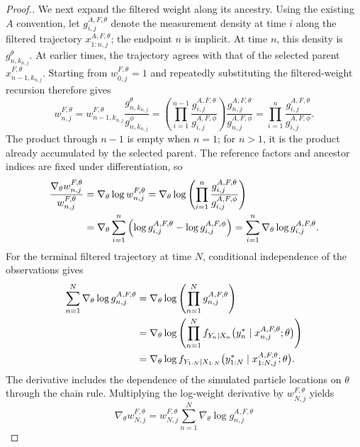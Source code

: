 \begin{proof}[Proof.]
We next expand the filtered weight along its ancestry. Using the existing
$A$ convention, let $g_{i,j}^{A,F,\theta}$ denote the measurement density
at time $i$ along the filtered trajectory $x_{1:n,j}^{A,F,\theta}$;
the endpoint $n$ is implicit. At time $n$, this density is
$g_{n,k_{n,j}}^\theta$. At earlier times, the trajectory agrees with that
of the selected parent $x_{n-1,k_{n,j}}^{F,\theta}$.
Starting from $w_{0,j}^{F,\theta}=1$ and repeatedly substituting the
filtered-weight recursion therefore gives
\begin{equation}
w_{n,j}^{F,\theta}
=w_{n-1,k_{n,j}}^{F,\theta}
 \frac{g_{n,k_{n,j}}^\theta}{g_{n,k_{n,j}}^\phi}
=\left(\prod_{i=1}^{n-1}
 \frac{g_{i,j}^{A,F,\theta}}{g_{i,j}^{A,F,\phi}}\right)
 \frac{g_{n,j}^{A,F,\theta}}{g_{n,j}^{A,F,\phi}}
=\prod_{i=1}^{n}\frac{g_{i,j}^{A,F,\theta}}{g_{i,j}^{A,F,\phi}}.
\label{eq:lemma-s1-ratio}
\end{equation}
The product through $n-1$ is empty when $n=1$; for $n>1$, it is the
product already accumulated by the selected parent. The reference
factors and ancestor indices are fixed under differentiation, so
\begin{align}
\frac{\nabla_\theta w_{n,j}^{F,\theta}}{w_{n,j}^{F,\theta}}
&=\nabla_\theta\log w_{n,j}^{F,\theta}
 =\nabla_\theta\log\left(
 \prod_{i=1}^{n}\frac{g_{i,j}^{A,F,\theta}}{g_{i,j}^{A,F,\phi}}\right)
 \notag\\*
&=\nabla_\theta\sum_{i=1}^{n}
 \left(\log g_{i,j}^{A,F,\theta}-\log g_{i,j}^{A,F,\phi}\right)
 =\sum_{i=1}^{n}\nabla_\theta\log g_{i,j}^{A,F,\theta}.
\end{align}
For the terminal filtered trajectory at time $N$, conditional independence
of the observations gives
\begin{align}
\sum_{n=1}^{N}\nabla_\theta\log g_{n,j}^{A,F,\theta}
&=\nabla_\theta\log\left(\prod_{n=1}^{N}g_{n,j}^{A,F,\theta}\right)
 \notag\\*
&=\nabla_\theta\log\left(\prod_{n=1}^{N}f_{Y_n|X_n}
 \big(y_n^*\mid x_{n,j}^{A,F,\theta};\theta\big)\right)
 \notag\\*
&=\nabla_\theta\log f_{Y_{1:N}|X_{1:N}}
 \big(y_{1:N}^*\mid x_{1:N,j}^{A,F,\theta};\theta\big).
\end{align}
The derivative includes the dependence of the simulated particle locations
on $\theta$ through the chain rule. Multiplying the log-weight derivative
by $w_{N,j}^{F,\theta}$ yields
\begin{equation}
\nabla_\theta w_{N,j}^{F,\theta}
=w_{N,j}^{F,\theta}\sum_{n=1}^{N}\nabla_\theta\log g_{n,j}^{A,F,\theta}

\end{equation}
\end{proof}
